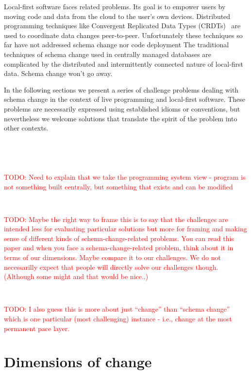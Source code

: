 \documentclass[english,submission]{programming}
\begin{document}
Local-first software faces related problems. Its goal is to empower users by moving code and data from the cloud to the user's own devices. Distributed programming techniques like Convergent Replicated Data Types (CRDTs)~\cite{Shapiro11} are used to coordinate data changes peer-to-peer. Unfortunately these techniques so far have not addressed schema change nor code deployment The traditional techniques of schema change used in centrally managed databases are complicated by the distributed and intermittently connected nature of local-first data. Schema change won't go away.

In the following sections we present a series of challenge problems dealing with schema change in the context of live programming and local-first software. These problems are necessarily expressed using established idioms or conventions, but nevertheless we welcome solutions that translate the spirit of the problem into other contexts.

~

~

\textcolor{red}{TODO: Need to explain that we take the programming system view - program is not something
built centrally, but something that exists and can be modified}

~

\textcolor{red}{TODO: Maybe the right way to frame this is to say that the challenges are intended
less for evaluating particular solutions but more for framing and making sense of different
kinds of schema-change-related problems.  You can read this paper and when you face a schema-change-related
problem, think about it in terms of our dimensions. Maybe compare it to our challenges.
We do not necessarilly expect that people will directly solve our challenges though. (Although
some might and that would be nice..)}

~

\textcolor{red}{TODO: I also guess this is more about just ``change'' than ``schema change''
which is one particular (most challenging) instance - i.e., change at the most permanent
pace layer.}

\newpage
\section{Dimensions of change}
\end{document}
